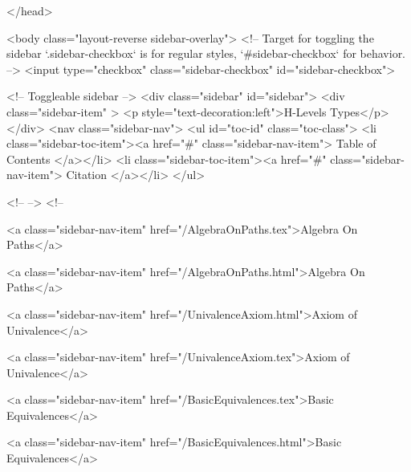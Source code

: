   
</head>




  <body class="layout-reverse sidebar-overlay">
    <!-- Target for toggling the sidebar `.sidebar-checkbox` is for regular
     styles, `#sidebar-checkbox` for behavior. -->
<input type="checkbox" class="sidebar-checkbox" id="sidebar-checkbox">

<!-- Toggleable sidebar -->
<div class="sidebar" id="sidebar">
  <div class="sidebar-item" >
    <p style="text-decoration:left">H-Levels Types</p>
  </div>
  <nav class="sidebar-nav">
    <ul id="toc-id" class="toc-class">
  <li class="sidebar-toc-item"><a href="#" class="sidebar-nav-item"> Table of Contents </a></li>
  <li class="sidebar-toc-item"><a href="#" class="sidebar-nav-item"> Citation </a></li>
</ul>


    <!--  -->
    <!-- 
      
    
      
    
      
    
      
    
      
        
      
    
      
        
          <a class="sidebar-nav-item" href="/AlgebraOnPaths.tex">Algebra On Paths</a>
        
      
    
      
        
          <a class="sidebar-nav-item" href="/AlgebraOnPaths.html">Algebra On Paths</a>
        
      
    
      
        
          <a class="sidebar-nav-item" href="/UnivalenceAxiom.html">Axiom of Univalence</a>
        
      
    
      
        
          <a class="sidebar-nav-item" href="/UnivalenceAxiom.tex">Axiom of Univalence</a>
        
      
    
      
        
          <a class="sidebar-nav-item" href="/BasicEquivalences.tex">Basic Equivalences</a>
        
      
    
      
        
          <a class="sidebar-nav-item" href="/BasicEquivalences.html">Basic Equivalences</a>
        
